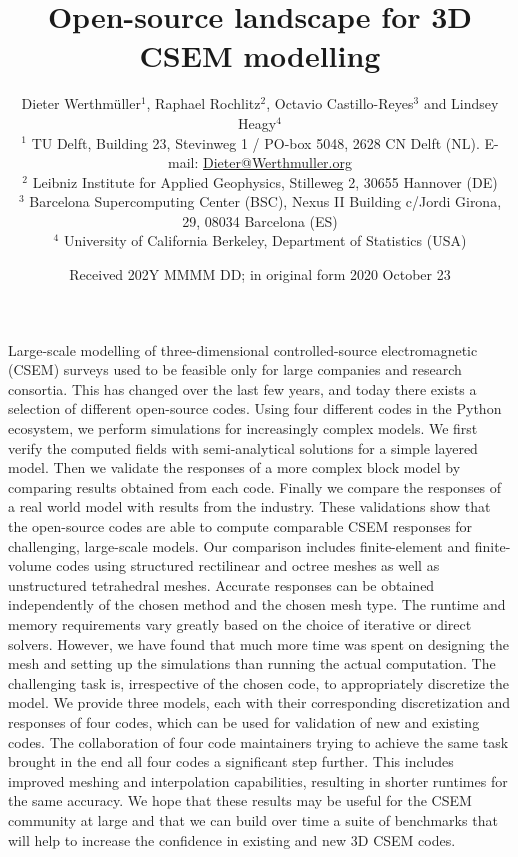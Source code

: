 \documentclass[onecolumn,extra,camera]{gji}
\title[Open-source 3D CSEM modelling]{Open-source landscape for 3D CSEM modelling}
\author[D. Werthmüller \emph{et al.}]
  {\Large Dieter Werthmüller$^1$,        %
   Raphael Rochlitz$^2$,          %
   Octavio Castillo-Reyes$^3$ and %
   Lindsey Heagy$^4$              %
   \\
   \footnotesize
  $^1$ TU Delft, Building 23, Stevinweg 1 / PO-box 5048, 2628 CN Delft (NL).
  E-mail: \href{mailto:Dieter@Werthmuller.org}{Dieter@Werthmuller.org}\\[-.3em]
   \footnotesize
  $^2$ Leibniz Institute for Applied Geophysics, Stilleweg 2, 30655 Hannover (DE)\\[-.3em]
   \footnotesize
   $^3$ Barcelona Supercomputing Center (BSC), Nexus II Building c/Jordi Girona, 29, 08034 Barcelona (ES)\\[-.3em]
   \footnotesize
  $^4$ University of California Berkeley, Department of Statistics (USA)
  }
\date{Received 202Y MMMM DD; in original form 2020 October 23}
\makeatletter
\let\zz@tabular\@tabular
\let\zzendtabular\endtabular
\let\zz@xtabularcr\@xtabularcr
\let\zz@tabclassz\@tabclassz
\let\zz@tabclassiv \@tabclassiv
\let\zz@tabarray\@tabarray
\makeatother
\begin{document}
\label{firstpage}

{\makeatletter
\let\@tabular\zz@tabular
\let\endtabular\zzendtabular
\let\@xtabularcr\zz@xtabularcr
\let\@tabclassz\zz@tabclassz
\let\@tabclassiv \zz@tabclassiv 
\let\@tabarray\zz@tabarray
\maketitle
}

\begin{summary}
Large-scale modelling of three-dimensional controlled-source electromagnetic (CSEM) surveys used to be feasible only for large companies and research consortia. This has changed over the last few years, and today there exists a selection of different open-source codes. Using four different codes in the Python ecosystem, we perform simulations for increasingly complex models. We first verify the computed fields with semi-analytical solutions for a simple layered model. Then we validate the responses of a more complex block model by comparing results obtained from each code. Finally we compare the responses of a real world model with results from the industry. These validations show that the open-source codes are able to compute comparable CSEM responses for challenging, large-scale models. Our comparison includes finite-element and finite-volume codes using structured rectilinear and octree meshes as well as unstructured tetrahedral meshes. Accurate responses can be obtained independently of the chosen method and the chosen mesh type. The runtime and memory requirements vary greatly based on the choice of iterative or direct solvers. However, we have found that much more time was spent on designing the mesh and setting up the simulations than running the actual computation. The challenging task is, irrespective of the chosen code, to appropriately discretize the model. We provide three models, each with their corresponding discretization and responses of four codes, which can be used for validation of new and existing codes. The collaboration of four code maintainers trying to achieve the same task brought in the end all four codes a significant step further. This includes improved meshing and interpolation capabilities, resulting in shorter runtimes for the same accuracy. We hope that these results may be useful for the CSEM community at large and that we can build over time a suite of benchmarks that will help to increase the confidence in existing and new 3D CSEM codes.
\end{summary}
\end{document}
